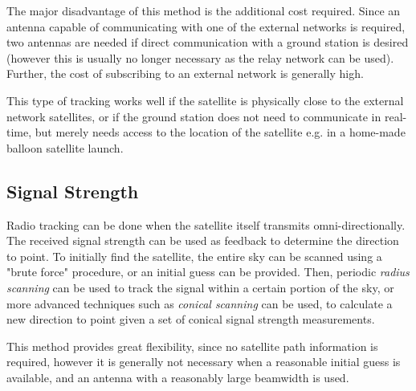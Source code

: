 The major disadvantage of this method is the additional cost required. Since an antenna capable of communicating with one of the external networks is required, two antennas are needed if direct communication with a ground station is desired (however this is usually no longer necessary as the relay network can be used). Further, the cost of subscribing to an external network is generally high.

This type of tracking works well if the satellite is physically close to the external network satellites, or if the ground station does not need to communicate in real-time, but merely needs access to the location of the satellite e.g. in a home-made balloon satellite launch.

\subsection{Signal Strength}
Radio tracking can be done when the satellite itself transmits omni-directionally. The received signal strength can be used as feedback to determine the direction to point. To initially find the satellite, the entire sky can be scanned using a "brute force" procedure, or an initial guess can be provided. Then, periodic \textit{radius scanning} can be used to track the signal within a certain portion of the sky, or more advanced techniques such as \textit{conical scanning} can be used, to calculate a new direction to point given a set of conical signal strength measurements.

This method provides great flexibility, since no satellite path information is required, however it is generally not necessary when a reasonable initial guess is available, and an antenna with a reasonably large beamwidth is used.